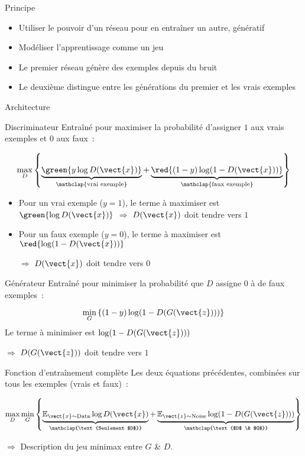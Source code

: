 \begin{frame}{Principe}
  \begin{itemize}[<+->]
    \item Utiliser le pouvoir d'un réseau pour en entraîner un autre, génératif
    \item Modéliser l'apprentissage comme un jeu
    \item Le premier réseau génère des exemples depuis du bruit
    \item Le deuxième distingue entre les générations du premier et les vrais exemples
  \end{itemize}
\end{frame}

\begin{frame}{Architecture}
\end{frame}

\begin{frame}{Discriminateur}
  Entraîné pour maximiser la probabilité d'assigner $1$ aux vrais exemples et $0$ aux faux~:

  \[
    \max_D
      \left\{
        \underbrace{\green{y \log D(\vect{x})}}_{\mathclap{\text{vrai exemple}}}
        +
        \underbrace{\red{(1 - y) \log (1 - D(\vect{x}))}}_{\mathclap{\text{faux exemple}}}
      \right\}
  \]

  \begin{itemize}[<+(1)->]
    \item Pour un vrai exemple ($y=1$), 
          le terme à maximiser est $\green{\log D(\vect{x})}$
          $\Rightarrow$ $D(\vect{x})$ doit tendre vers $1$
    \item Pour un faux exemple ($y=0$), le terme à maximiser est $\red{\log (1 - D(\vect{x}))}$

    $\Rightarrow$ $D(\vect{x})$ doit tendre vers $0$
  \end{itemize}
\end{frame}

\begin{frame}{Générateur}
  Entraîné pour minimiser la probabilité que $D$ assigne $0$ à de faux exemples~:

  \[
    \min_G
      \left\{
        (1 - y) \log (1 - D(G(\vect{z})))
      \right\}
  \]
  Le terme à minimiser est $\log (1 - D(G(\vect{z})))$

  $\Rightarrow$ $D(G(\vect{z}))$ doit tendre vers $1$
\end{frame}

\begin{frame}{Fonction d'entraînement complète}
  Les deux équations précédentes, 
  combinées sur tous les exemples (vrais et faux)~:

  \[
    \max_D \min_G \left\{
      \underbrace{\mathbb{E}_{\vect{x} \sim \text{Data}} \log D(\vect{x})}_{\mathclap{\text{Seulement $D$}}}
      + \underbrace{\mathbb{E}_{\vect{z} \sim \text{Noise}} \log (1 - D(G(\vect{z})))}_{\mathclap{\text{$D$ \& $G$}}}
    \right\}
  \]

  $\Rightarrow$ Description du jeu minimax entre $G$ \& $D$.
\end{frame}

